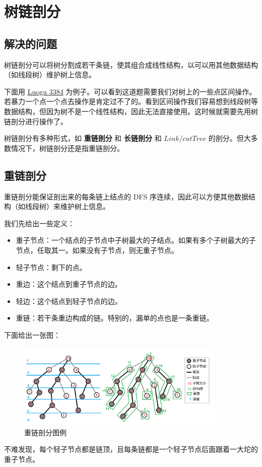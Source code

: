 \documentclass[11pt,oneside,a4paper,UTF8]{book}
\begin{document}
	\section{树链剖分}
	\subsection{解决的问题}
	树链剖分可以将树分割成若干条链，使其组合成线性结构，以可以用其他数据结构（如线段树）维护树上信息。\par
	下面用 \href{https://www.luogu.com.cn/problem/P3384}{Luogu 3384} 为例子。可以看到这道题需要我们对树上的一些点区间操作。若暴力一个点一个点去操作是肯定过不了的。看到区间操作我们容易想到线段树等数据结构，但因为树不是一个线性结构，因此无法直接使用。这时候就需要先用树链剖分进行操作了。\par
	树链剖分有多种形式，如 \textbf{重链剖分} 和 \textbf{长链剖分} 和 $Link/cut Tree$ 的剖分。但大多数情况下，树链剖分还是指重链剖分。\par
	\subsection{重链剖分}
	重链剖分能保证剖出来的每条链上结点的 DFS 序连续，因此可以方便其他数据结构（如线段树）来维护树上信息。\par
	我们先给出一些定义：
	\begin{itemize}
		\item 重子节点：一个结点的子节点中子树最大的子结点。如果有多个子树最大的子节点，任取其一。如果没有子节点，则无重子节点。
		\item 轻子节点：剩下的点。
		\item 重边：这个结点到重子节点的边。
		\item 轻边：这个结点到轻子节点的边。
		\item 重链：若干条重边构成的链。特别的，漏单的点也是一条重链。
	\end{itemize}
	下面给出一张图：
	\begin{figure}[H]
		\centering
		\includegraphics[width=10cm]{picture/图论/树/1.png}
		\caption{重链剖分图例}
	\end{figure}\par
	不难发现，每个轻子节点都是链顶，且每条链都是一个轻子节点后面跟着一大坨的重子节点。
	
\end{document}
